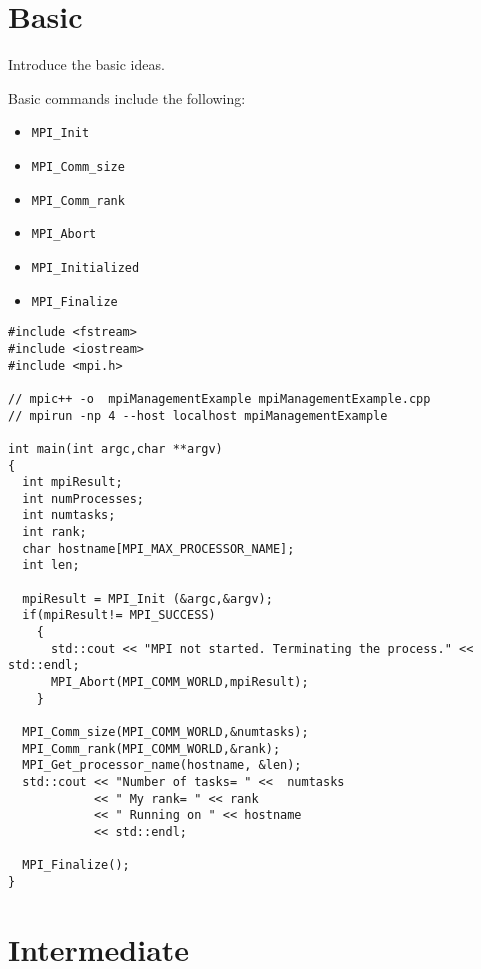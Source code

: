 
\section{Basic}

Introduce the basic ideas.

Basic commands include the following: \\
\begin{itemize}
\item \texttt{MPI\_Init}
\item \texttt{MPI\_Comm\_size}
\item \texttt{MPI\_Comm\_rank}
\item \texttt{MPI\_Abort}
\item \texttt{MPI\_Initialized}
\item \texttt{MPI\_Finalize}
\end{itemize}



\lstset{language=C++, numbers=left, numberstyle=\tiny, stepnumber=1,
  numbersep=5pt, commentstyle=\scriptsize}
\begin{lstlisting}[caption={Basic Process Information},
                   basicstyle=\scriptsize,
                   label=listing:touch]
#include <fstream>
#include <iostream>
#include <mpi.h>

// mpic++ -o  mpiManagementExample mpiManagementExample.cpp 
// mpirun -np 4 --host localhost mpiManagementExample

int main(int argc,char **argv)
{
  int mpiResult;
  int numProcesses;
  int numtasks;
  int rank;
  char hostname[MPI_MAX_PROCESSOR_NAME];
  int len;

  mpiResult = MPI_Init (&argc,&argv);
  if(mpiResult!= MPI_SUCCESS)
    {
      std::cout << "MPI not started. Terminating the process." << std::endl;
      MPI_Abort(MPI_COMM_WORLD,mpiResult);
    }

  MPI_Comm_size(MPI_COMM_WORLD,&numtasks);
  MPI_Comm_rank(MPI_COMM_WORLD,&rank);
  MPI_Get_processor_name(hostname, &len);
  std::cout << "Number of tasks= " <<  numtasks
            << " My rank= " << rank
            << " Running on " << hostname
            << std::endl;

  MPI_Finalize();
}
\end{lstlisting}


\section{Intermediate}

